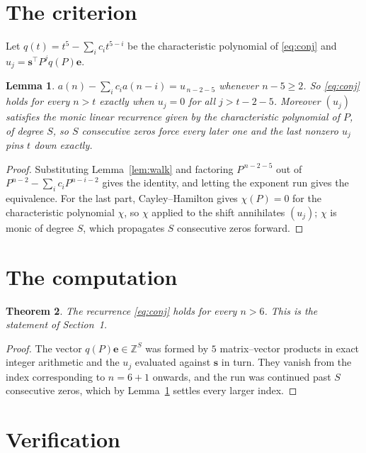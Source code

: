 \documentclass[11pt,a4paper]{article}
\theoremstyle{plain}
\newtheorem{theorem}{Theorem}
\newtheorem{lemma}[theorem]{Lemma}
\theoremstyle{definition}
\begin{document}
\section{The criterion}

Let $q(t)=t^{5}-\sum_i c_i t^{5-i}$ be the characteristic polynomial of
\eqref{eq:conj} and $u_j=\mathbf{s}^{\!\top}P^{j}q(P)\mathbf{e}$.

\begin{lemma}\label{lem:crit}
$a(n)-\sum_i c_i a(n-i)=u_{\,n-2-5}$ whenever $n-5\ge2$. So \eqref{eq:conj}
holds for every $n>t$ exactly when $u_j=0$ for all $j>t-2-5$. Moreover $(u_j)$
satisfies the monic linear recurrence given by the characteristic polynomial of $P$, of
degree $S$, so $S$ consecutive zeros force every later one and the last nonzero $u_j$ pins
$t$ down exactly.
\end{lemma}

\begin{proof}
Substituting Lemma~\ref{lem:walk} and factoring $P^{\,n-2-5}$ out of
$P^{n-2}-\sum_i c_i P^{n-i-2}$ gives the identity, and letting the exponent run gives the
equivalence. For the last part, Cayley--Hamilton gives $\chi(P)=0$ for the characteristic
polynomial $\chi$, so $\chi$ applied to the shift annihilates $(u_j)$; $\chi$ is monic of
degree $S$, which propagates $S$ consecutive zeros forward.
\end{proof}

\section{The computation}

\begin{theorem}
The recurrence \eqref{eq:conj} holds for every $n>6$. This is the statement of
Section~1.
\end{theorem}

\begin{proof}
The vector $q(P)\mathbf{e}\in\mathbb{Z}^{S}$ was formed by $5$ matrix--vector
products in exact integer arithmetic and the $u_j$ evaluated against $\mathbf{s}$ in turn.
They vanish from the index corresponding to $n=6+1$ onwards, and the run was continued
past $S$ consecutive zeros, which by Lemma~\ref{lem:crit} settles every larger index.
\end{proof}

\section{Verification}
\end{document}
